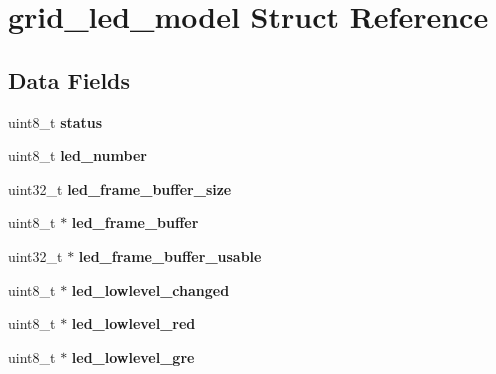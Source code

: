 \hypertarget{structgrid__led__model}{\section{grid\-\_\-led\-\_\-model Struct Reference}
\label{structgrid__led__model}
}
\subsection*{Data Fields}
\begin{DoxyCompactItemize}
\item 
\hypertarget{structgrid__led__model_ab7b9b48b9ffee56e061b19c7a6fcc7d0}{uint8\-\_\-t {\bfseries status}}\label{structgrid__led__model_ab7b9b48b9ffee56e061b19c7a6fcc7d0}

\item 
\hypertarget{structgrid__led__model_a28f89146fecd01a889d98d2b28662ae9}{uint8\-\_\-t {\bfseries led\-\_\-number}}\label{structgrid__led__model_a28f89146fecd01a889d98d2b28662ae9}

\item 
\hypertarget{structgrid__led__model_ab661077526c6b7a22318d1fd425b32d3}{uint32\-\_\-t {\bfseries led\-\_\-frame\-\_\-buffer\-\_\-size}}\label{structgrid__led__model_ab661077526c6b7a22318d1fd425b32d3}

\item 
\hypertarget{structgrid__led__model_ac124697a4742a1543999bdbe8953d3e7}{uint8\-\_\-t $\ast$ {\bfseries led\-\_\-frame\-\_\-buffer}}\label{structgrid__led__model_ac124697a4742a1543999bdbe8953d3e7}

\item 
\hypertarget{structgrid__led__model_a497b0c3c96cd84924ef48620f3ea1494}{uint32\-\_\-t $\ast$ {\bfseries led\-\_\-frame\-\_\-buffer\-\_\-usable}}\label{structgrid__led__model_a497b0c3c96cd84924ef48620f3ea1494}

\item 
\hypertarget{structgrid__led__model_ac2db98a28d5191947b0b2bc2e34304a0}{uint8\-\_\-t $\ast$ {\bfseries led\-\_\-lowlevel\-\_\-changed}}\label{structgrid__led__model_ac2db98a28d5191947b0b2bc2e34304a0}

\item 
\hypertarget{structgrid__led__model_ab82769175a0b64b1e53348a915065b8a}{uint8\-\_\-t $\ast$ {\bfseries led\-\_\-lowlevel\-\_\-red}}\label{structgrid__led__model_ab82769175a0b64b1e53348a915065b8a}

\item 
\hypertarget{structgrid__led__model_a307f7834c0c4c94a79ad4d664c1fc70c}{uint8\-\_\-t $\ast$ {\bfseries led\-\_\-lowlevel\-\_\-gre}}\label{structgrid__led__model_a307f7834c0c4c94a79ad4d664c1fc70c}


\end{DoxyCompactItemize}

